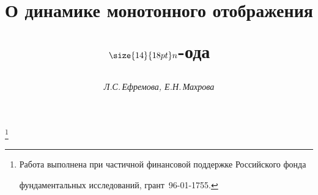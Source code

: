 









\newcommand{\fm}{$f\in M^0(X)$}


\newcommand{\ga}{\gamma}


\newcommand{\card}{\operatorname{card}}


\newcommand{\Per}{\operatorname{Per}}


\newcommand{\ty}{\bigcup\limits_{m=0}^{+\infty}f^{-m}(0)}




\newcommand{\tts}[1]{}


\newcommand{\myfont}{\series{m}\normalshape\selectfont}


\renewcommand{\baselinestretch}{1.05}










\setcounter{page}{31}












\author{\it Л.С.\,Ефремова, Е.Н.\,Махрова}


\title {О динамике монотонного отображения


$\size{14}{18pt}\selectfont n$-ода}





\thanks{Работа выполнена при частичной финансовой поддержке Российского фонда


фундаментальных исследований, грант \No\,96-01-1755.}


